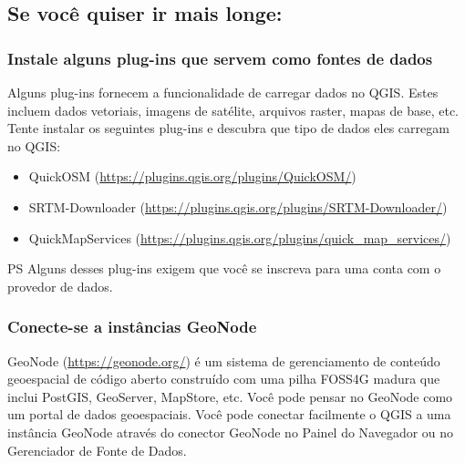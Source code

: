 \documentclass[
  portuguese,
]{krantz}
\providecommand{\tightlist}{%
  \setlength{\itemsep}{0pt}\setlength{\parskip}{0pt}}
\begin{document}
\hypertarget{se-vocuxea-quiser-ir-mais-longe-2}{%
\subsection{Se você quiser ir mais longe:}\label{se-vocuxea-quiser-ir-mais-longe-2}}

\hypertarget{instale-alguns-plug-ins-que-servem-como-fontes-de-dados}{%
\subsubsection{\texorpdfstring{\textbf{Instale alguns plug-ins que servem como fontes de dados}}{Instale alguns plug-ins que servem como fontes de dados}}\label{instale-alguns-plug-ins-que-servem-como-fontes-de-dados}}

Alguns plug-ins fornecem a funcionalidade de carregar dados no QGIS. Estes incluem dados vetoriais, imagens de satélite, arquivos raster, mapas de base, etc. Tente instalar os seguintes plug-ins e descubra que tipo de dados eles carregam no QGIS:

\begin{itemize}
\tightlist
\item
  QuickOSM (\url{https://plugins.qgis.org/plugins/QuickOSM/})
\item
  SRTM-Downloader (\url{https://plugins.qgis.org/plugins/SRTM-Downloader/})
\item
  QuickMapServices (\url{https://plugins.qgis.org/plugins/quick_map_services/})
\end{itemize}

PS Alguns desses plug-ins exigem que você se inscreva para uma conta com o provedor de dados.

\hypertarget{conecte-se-a-instuxe2ncias-geonode}{%
\subsubsection{\texorpdfstring{\textbf{Conecte-se a instâncias GeoNode}}{Conecte-se a instâncias GeoNode}}\label{conecte-se-a-instuxe2ncias-geonode}}

GeoNode (\url{https://geonode.org/}) é um sistema de gerenciamento de conteúdo geoespacial de código aberto construído com uma pilha FOSS4G madura que inclui PostGIS, GeoServer, MapStore, etc. Você pode pensar no GeoNode como um portal de dados geoespaciais. Você pode conectar facilmente o QGIS a uma instância GeoNode através do conector GeoNode no Painel do Navegador ou no Gerenciador de Fonte de Dados.
\end{document}
